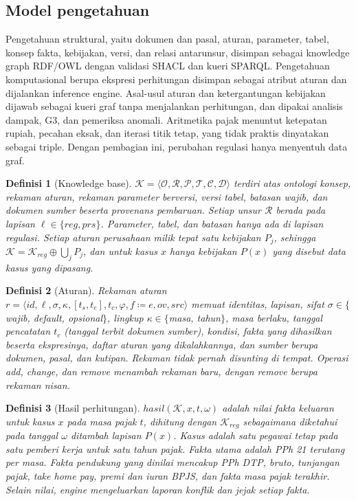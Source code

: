 \documentclass[journal,a4paper]{IEEEtran}
\makeatletter
\DeclareRobustCommand{\en}[1]{{\usefont{\f@encoding}{\f@family}{\f@series}{it}#1\/}}
\newtheorem{definisi}{Definisi}
\newcommand{\K}{\mathcal{K}}
\newcommand{\hasil}{\mathit{hasil}}
\makeatother
\begin{document}
\subsection{Model pengetahuan}
Pengetahuan struktural, yaitu dokumen dan pasal, aturan, parameter, tabel, konsep fakta, kebijakan, versi, dan relasi antarunsur, disimpan sebagai \en{knowledge graph} RDF/OWL dengan validasi SHACL dan kueri SPARQL. Pengetahuan komputasional berupa ekspresi perhitungan disimpan sebagai atribut aturan dan dijalankan \en{inference engine}. Asal-usul aturan dan ketergantungan kebijakan dijawab sebagai kueri graf tanpa menjalankan perhitungan, dan dipakai analisis dampak, G3, dan pemeriksa anomali. Aritmetika pajak menuntut ketepatan rupiah, pecahan eksak, dan iterasi titik tetap, yang tidak praktis dinyatakan sebagai \en{triple}. Dengan pembagian ini, perubahan regulasi hanya menyentuh data graf.

\begin{definisi}[\en{Knowledge base}]
\label{def:kb}
$\K = \langle \mathcal{O}, \mathcal{R}, \mathcal{P}, \mathcal{T}, \mathcal{C}, \mathcal{D} \rangle$ terdiri atas ontologi konsep, rekaman aturan, rekaman parameter berversi, versi tabel, batasan wajib, dan dokumen sumber beserta provenans pembaruan. Setiap unsur $\mathcal{R}$ berada pada lapisan $\ell \in \{\mathit{reg}, \mathit{prs}\}$. Parameter, tabel, dan batasan hanya ada di lapisan regulasi. Setiap aturan perusahaan milik tepat satu kebijakan $P_j$, sehingga $\K = \K_{\mathit{reg}} \oplus \bigcup_j P_j$, dan untuk kasus $x$ hanya kebijakan $P(x)$ yang disebut data kasus yang dipasang.
\end{definisi}

\begin{definisi}[Aturan]
\label{def:aturan}
Rekaman aturan $r = \langle \mathit{id}, \ell, \sigma, \kappa, [t_s, t_e], t_c, \varphi, f \coloneqq e, \mathit{ov}, \mathit{src} \rangle$ memuat identitas, lapisan, sifat $\sigma \in \{$wajib, \en{default}, opsional$\}$, lingkup $\kappa \in \{$masa, tahun$\}$, masa berlaku, tanggal pencatatan $t_c$ (tanggal terbit dokumen sumber), kondisi, fakta yang dihasilkan beserta ekspresinya, daftar aturan yang dikalahkannya, dan sumber berupa dokumen, pasal, dan kutipan. Rekaman tidak pernah disunting di tempat. Operasi \en{add}, \en{change}, dan \en{remove} menambah rekaman baru, dengan \en{remove} berupa rekaman nisan.
\end{definisi}

\begin{definisi}[Hasil perhitungan]
\label{def:hasil}
$\hasil(\K, x, t, \omega)$ adalah nilai fakta keluaran untuk kasus $x$ pada masa pajak $t$, dihitung dengan $\K_{\mathit{reg}}$ sebagaimana diketahui pada tanggal $\omega$ ditambah lapisan $P(x)$. Kasus adalah satu pegawai tetap pada satu pemberi kerja untuk satu tahun pajak. Fakta utama adalah PPh 21 terutang per masa. Fakta pendukung yang dinilai mencakup PPh DTP, bruto, tunjangan pajak, \en{take home pay}, premi dan iuran BPJS, dan fakta masa pajak terakhir. Selain nilai, \en{engine} mengeluarkan laporan konflik dan jejak setiap fakta.
\end{definisi}
\end{document}
